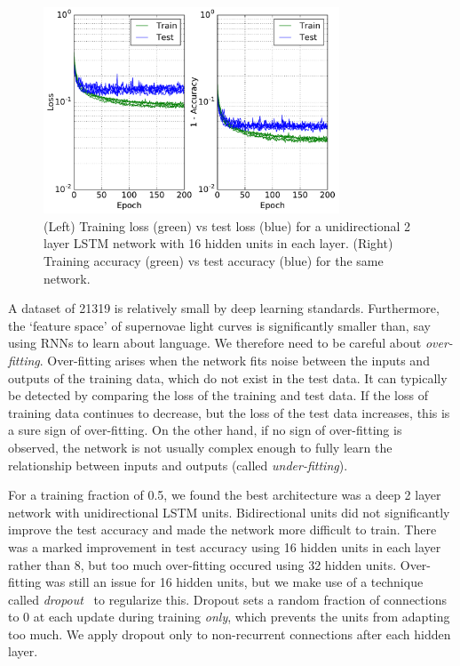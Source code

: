 \documentclass[nofootinbib,amsmath,amssymb,10pt,eqsecnum, twocolumn]{revtex4-1}
\begin{document}
\begin{figure}
\centering
\includegraphics[width=88mm, angle=0]{3.pdf}
\caption{\label{fig:loss} (Left) Training loss (green) vs test loss (blue) for a unidirectional 2 layer  LSTM network with 16 hidden units in each layer. (Right) Training accuracy (green) vs test accuracy (blue) for the same network.  }
\end{figure}

A dataset of 21319 is relatively small by deep learning standards. Furthermore, the `feature space' of supernovae light curves is significantly smaller than, say using RNNs to learn about language. We therefore need to be careful about {\em over-fitting}. Over-fitting arises when the network fits noise between the inputs and outputs of the training data, which do not exist in the test data. It can typically be detected by comparing the loss of the training and test data. If the loss of training data continues to decrease, but the loss of the test data increases, this is a sure sign of over-fitting. On the other hand, if no sign of over-fitting is observed, the network is not usually complex enough to fully learn the relationship between inputs and outputs (called {\em under-fitting}).  

For a training fraction of 0.5, we found the best architecture was a deep 2 layer network with unidirectional LSTM units. Bidirectional units did not significantly improve the test accuracy and made the network more difficult to train. There was a marked improvement in test accuracy using 16 hidden units in each layer rather than 8, but too much over-fitting occured using 32 hidden units. Over-fitting was still an issue for 16 hidden units,  but we make use of a technique called {\em dropout}~\cite{JMLR:v15:srivastava14a} to regularize this. Dropout  sets a random fraction of connections to 0 at each update during training {\em only}, which prevents the units from adapting too much. We apply dropout only to non-recurrent connections after each hidden layer. 
\end{document}
